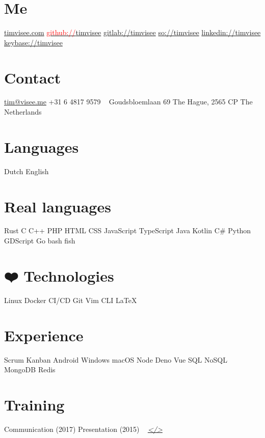 \documentclass[]{cv-timvisee}
\begin{document}


\begin{aside}
\section{Me}
\href{https://timvisee.com/}{timvisee.com}
\href{https://github.com/timvisee}{\textcolor{red}{github://}timvisee}
\href{https://gitlab.com/timvisee}{gitlab://timvisee}
\href{https://stackoverflow.com/users/1000145}{so://timvisee}
\href{https://linkedin.com/in/timvisee}{linkedin://timvisee}
\href{https://keybase.io/timvisee}{keybase://timvisee}
\section{Contact}
\href{mailto:tim@visee.me}{tim@visee.me}
+31 6 4817 9579
~
Goudsbloemlaan 69
The Hague, 2565 CP
The Netherlands
\section{Languages}
Dutch \textperiodcentered{} English
\section{Real languages}
Rust \textperiodcentered{} C \textperiodcentered{} C++
PHP \textperiodcentered{} HTML \textperiodcentered{} CSS
JavaScript \textperiodcentered{} TypeScript
Java \textperiodcentered{} Kotlin \textperiodcentered{} C\#
Python \textperiodcentered{} GDScript \textperiodcentered{} Go
bash \textperiodcentered{} fish
\section{{\DejaSans ❤️} Technologies}
Linux \textperiodcentered{} Docker \textperiodcentered{} CI/CD
Git \textperiodcentered{} Vim \textperiodcentered{} CLI \textperiodcentered{} \LaTeX{}
\section{Experience}
Scrum \textperiodcentered{} Kanban
Android \textperiodcentered{} Windows \textperiodcentered{} macOS
Node \textperiodcentered{} Deno \textperiodcentered{} Vue
SQL \textperiodcentered{} NoSQL
MongoDB \textperiodcentered{} Redis
\section{Training}
Communication (2017)
Presentation (2015)
~
\textit{\href{https://github.com/timvisee/cv}{</>}}
\end{aside}
\end{document}
